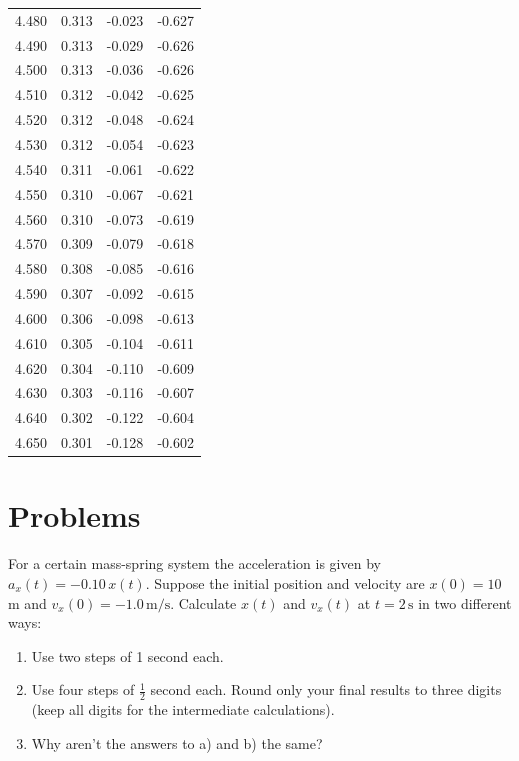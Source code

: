 \begin{table}[!t]
\begin{center}
\begin{tabular}{cccc}
4.480  &  0.313  &  -0.023  &  -0.627\\
4.490  &  0.313  &  -0.029  &  -0.626\\
4.500  &  0.313  &  -0.036  &  -0.626\\
4.510  &  0.312  &  -0.042  &  -0.625\\
4.520  &  0.312  &  -0.048  &  -0.624\\
4.530  &  0.312  &  -0.054  &  -0.623\\
4.540  &  0.311  &  -0.061  &  -0.622\\
4.550  &  0.310  &  -0.067  &  -0.621\\
4.560  &  0.310  &  -0.073  &  -0.619\\
4.570  &  0.309  &  -0.079  &  -0.618\\
4.580  &  0.308  &  -0.085  &  -0.616\\
4.590  &  0.307  &  -0.092  &  -0.615\\
4.600  &  0.306  &  -0.098  &  -0.613\\
4.610  &  0.305  &  -0.104  &  -0.611\\
4.620  &  0.304  &  -0.110  &  -0.609\\
4.630  &  0.303  &  -0.116  &  -0.607\\
4.640  &  0.302  &  -0.122  &  -0.604\\
4.650  &  0.301  &  -0.128  &  -0.602\\

\end{tabular}
\end{center}
\label{table:numerical2}
\end{table}

 
\addtolength{\textheight}{-.5in} 
\addtolength{\footskip}{2.in}






\section*{Problems}

\begin{exercise}
  For a certain mass-spring system the acceleration is given by $a_x(t) =
  -0.10\, x(t)$.  Suppose the initial position and velocity are $x(0)
  = 10$ m and $v_x(0) = -1.0\, \mbox{m/s}$.  Calculate $x(t)$ and $v_x(t)$
  at $t = 2\, \mbox{s}$ in two different ways:
  \begin{enumerate}
  \item Use two steps of 1 second each.
  \item Use four steps of $\frac{1}{2}$ second each.  Round only your
    final results to three digits (keep all digits for the
    intermediate calculations).
  \item Why aren't the answers to a) and b) the same?
  \end{enumerate}
  \label{problem:ho-undamped-num}
\end{exercise}


